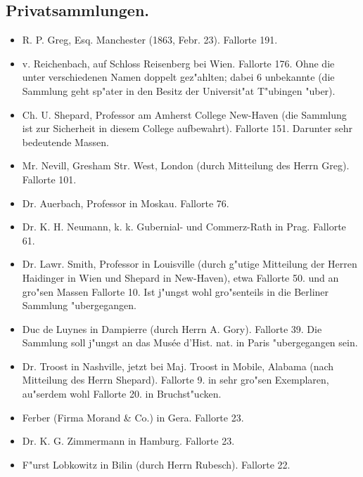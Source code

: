 \documentclass[a4paper, 11pt, oneside]{article}
\begin{document}
\subsection*{Privatsammlungen.}
\begin{itemize}
    \item R. P. Greg, Esq. Manchester (1863, Febr. 23). Fallorte 191.

    \item v. Reichenbach, auf Schloss Reisenberg bei Wien. Fallorte 176. Ohne die unter verschiedenen Namen doppelt gez"ahlten; dabei 6 unbekannte (die Sammlung geht sp"ater in den Besitz der Universit"at T"ubingen "uber).

    \item Ch. U. Shepard, Professor am Amherst College New-Haven (die Sammlung ist zur Sicherheit in diesem College aufbewahrt). Fallorte 151. Darunter sehr bedeutende Massen.

    \item Mr. Nevill, Gresham Str. West, London (durch Mitteilung des Herrn Greg). Fallorte 101.

    \item Dr. Auerbach, Professor in Moskau. Fallorte 76.

    \item Dr. K. H. Neumann, k. k. Gubernial- und Commerz-Rath in Prag. Fallorte 61.

    \item Dr. Lawr. Smith, Professor in Louisville (durch g"utige Mitteilung der Herren Haidinger in Wien und Shepard in New-Haven), etwa Fallorte 50. und an gro"sen Massen Fallorte 10. Ist j"ungst wohl gro"senteils in die Berliner Sammlung "ubergegangen.

    \item Duc de Luynes in Dampierre (durch Herrn A. Gory). Fallorte 39. Die Sammlung soll j"ungst an das Musée d'Hist. nat. in Paris "ubergegangen sein.

    \item Dr. Troost in Nashville, jetzt bei Maj. Troost in Mobile, Alabama (nach Mitteilung des Herrn Shepard). Fallorte 9. in sehr gro"sen Exemplaren, au"serdem wohl Fallorte 20. in Bruchst"ucken.

    \item Ferber (Firma Morand \& Co.) in Gera. Fallorte 23.

    \item Dr. K. G. Zimmermann in Hamburg. Fallorte 23.

    \item F"urst Lobkowitz in Bilin (durch Herrn Rubesch). Fallorte 22.


\end{itemize}
\end{document}
